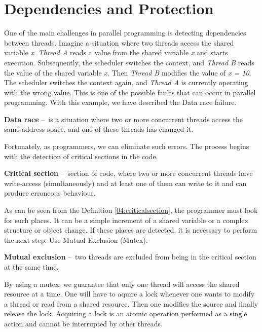 \section{Dependencies and Protection}
\label{dependenciesandprotection}

One of the main challenges in parallel programming is detecting dependencies between threads.
Imagine a situation where two threads access the shared variable \emph{x}. \emph{Thread A} reads a value from the shared variable \emph{x} and starts execution.
Subsequently, the scheduler switches the context, and \emph{Thread B} reads the value of the shared variable \emph{x}. Then \emph{Thread B} modifies the value of \emph{x = 10}.
The scheduler switches the context again, and \emph{Thread A} is currently operating with the wrong value.
This is one of the possible faults that can occur in parallel programming.
With this example, we have described the Data race failure.

\begin{definition}
    \textbf{Data race} \---\ is a situation where two or more concurrent threads access the same address space, and one of these threads has changed it.
\end{definition}
Fortunately, as programmers, we can eliminate such errors.
The process begins with the detection of critical sections in the code.
\begin{definition}
    \label{04:criticalsection}
    \textbf{Critical section} \---\ section of code, where two or more concurrent threads have write-access (simultaneously) and at least one of them can write to it and can produce erroneous behaviour.
\end{definition}
As can be seen from the Definition \ref{04:criticalsection}, the programmer must look for such places.
It can be a simple increment of a shared variable or a complex structure or object change.
If these places are detected, it is necessary to perform the next step.
Use Mutual Exclusion (Mutex).
\begin {definition}
    \textbf{Mutual exclusion} \---\ two threads are excluded from being in the critical section at the same time.
\end {definition}
By using a mutex, we guarantee that only one thread will access the shared resource at a time.
One will have to aquire a lock whenever one wants to modify a thread or read from a shared resource.
Then one modifies the source and finally release the lock.
Acquiring a lock is an atomic operation performed as a single action and cannot be interrupted by other threads.

